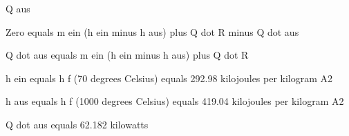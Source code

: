 Q aus

Zero equals m ein (h ein minus h aus) plus Q dot R minus Q dot aus

Q dot aus equals m ein (h ein minus h aus) plus Q dot R

h ein equals h f (70 degrees Celsius) equals 292.98 kilojoules per kilogram A2

h aus equals h f (1000 degrees Celsius) equals 419.04 kilojoules per kilogram A2

Q dot aus equals 62.182 kilowatts